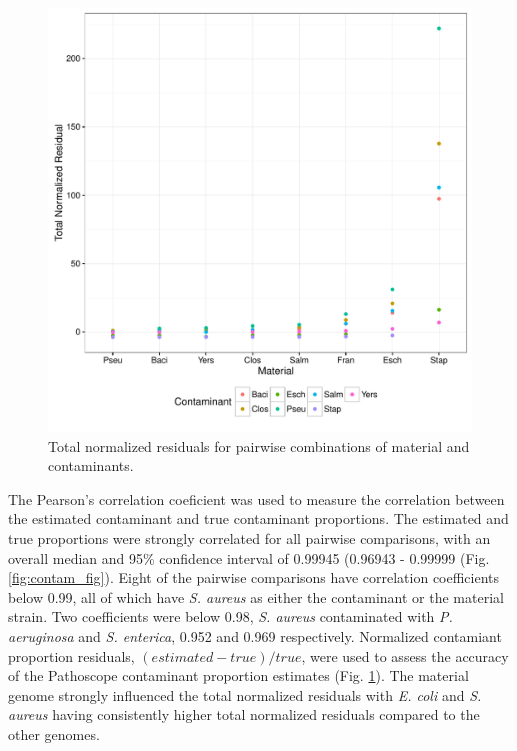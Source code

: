 \documentclass[fleqn,10pt,lineno]{wlpeerj}\usepackage[]{graphicx}\usepackage[]{color}
\makeatletter
\def\maxwidth{ %
  \ifdim\Gin@nat@width>\linewidth
    \linewidth
  \else
    \Gin@nat@width
  \fi
}
\newenvironment{knitrout}{}{} %
\makeatother
\begin{document}
\begin{knitrout}
\color{fgcolor}\begin{figure}
\includegraphics[width=\maxwidth]{figure/contam_resid-1} \caption[Total normalized residuals for pairwise combinations of material and contaminants]{Total normalized residuals for pairwise combinations of material and contaminants.}\label{fig:contam_resid}
\end{figure}


\end{knitrout}


The Pearson's correlation coeficient was used to measure the correlation between the estimated contaminant and true contaminant proportions. 
The estimated and true proportions were strongly correlated for all pairwise comparisons, with an overall median and 95\% confidence interval of 0.99945 (0.96943 - 0.99999 (Fig. \ref{fig:contam_fig}). 
Eight of the pairwise comparisons have correlation coefficients below 0.99, all of which have \textit{S. aureus} as either the contaminant or the material strain. 
Two coefficients were below 0.98, \textit{S. aureus} contaminated with \textit{P. aeruginosa} and \textit{S. enterica}, 0.952 and 0.969 respectively. 
Normalized contamiant proportion residuals, $(estimated-true)/true$, were used to assess the accuracy of the Pathoscope contaminant proportion estimates (Fig. \ref{fig:contam_resid}). 
The material genome strongly influenced the total normalized residuals with \textit{E. coli} and \textit{S. aureus} having consistently higher total normalized residuals compared to the other genomes. 
\end{document}
